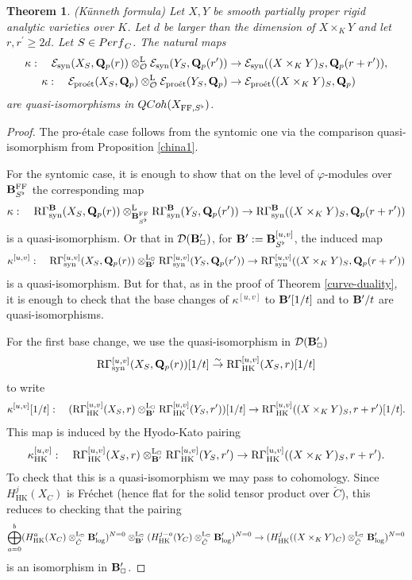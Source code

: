\documentclass[10pt,reqno]{amsart}
\newtheorem{theorem}[equation]{Theorem}
\theoremstyle{definition}
\theoremstyle{remark}
\def\phi{\varphi}
\newcommand{\proeet}{\operatorname{pro\acute{e}t} }
\newcommand{\synt}{ \operatorname{syn} }
\newcommand{\hk}{\operatorname{HK} }
\newcommand{\LL}{\operatorname{L} }
\newcommand{\FF}{\operatorname{FF} }
\newcommand{\so}{{\mathcal O}}
\newcommand{\se}{{\mathcal{E}}}
\newcommand{\sd}{{\mathcal{D}}}
\numberwithin{equation}{section}
\def\R{{\mathrm R}}
\def\Q{{\bf Q}} \def\Z{{\bf Z}}
\def\KAPPA{$\kappa$, $\kappa_{\rm HT}$, $\kappa_{\rm dR}$, $\kappa^{[u,v]}$}
\numberwithin{equation}{section}
\begin{document}
 \begin{theorem}{\rm(K\"unneth formula)} Let $X,Y$ be smooth partially proper rigid analytic varieties over $K$. Let $d$ be larger than the dimension of $X\times_KY$ and let $r,r^{\prime}\geq 2d$.  Let $S\in {\rm Perf}_C$.
 The natural \index{KAPPA@\KAPPA}maps 
 \begin{align*}
\kappa:\quad   \se_{\synt}(X_S,\Q_p(r))\otimes^{\LL}_{\so} \se_{\synt}(Y_S,\Q_p(r^{\prime}))  & \to \se_{\synt}((X\times_K Y)_S,\Q_p(r+r^{\prime})),\\
\kappa:\quad   \se_{\proeet}(X_S,\Q_p)\otimes^{\LL}_{\so} \se_{\proeet}(Y_S,\Q_p)  & \to \se_{\proeet}((X\times_K Y)_S,\Q_p)
 \end{align*}
 are quasi-isomorphisms in ${\rm QCoh}(X_{\FF,S^{\flat}})$. 
  \end{theorem}
 \begin{proof} The pro-\'etale case follows from the syntomic one via the comparison quasi-isomorphism from Proposition \ref{china1}.
 
  For the syntomic case,  it is enough to show that on the level of $\phi$-modules over  $\B^{\FF}_{S^{\flat}}$ the corresponding map
 $$
 \kappa:  \quad\R\Gamma_{\synt}^{\B}(X_S,\Q_p(r))\otimes^{\LL}_{\B^{\FF}_{S^{\flat}}} \R\Gamma_{\synt}^{\B}(Y_S,\Q_p(r^{\prime})) \to \R\Gamma_{\synt}^{\B}((X\times_K Y)_S,\Q_p(r+r^{\prime}))
 $$
 is a quasi-isomorphism.  Or that in $\sd(\B^{\prime}_{\Box})$, for  ${\bf B}^{\prime}:={\bf B}_{S^{\flat}}^{[u,v]}$, the induced \index{KAPPA@\KAPPA}map
 $$
  \kappa^{[u,v]}: \quad  \R\Gamma_{\synt}^{{[u,v]}}(X_S,\Q_p(r))\otimes^{\LL_{\Box}}_{\B^{\prime}} \R\Gamma_{\synt}^{{[u,v]}}(Y_S,\Q_p(r^{\prime})) \to \R\Gamma_{\synt}^{{[u,v]}}((X\times_K Y)_S,\Q_p(r+r^{\prime}))
  $$
 is a quasi-isomorphism.   But for that, as in the proof of Theorem \ref{curve-duality},  it is enough to check that the base changes of $  \kappa^{[u,v]}$ to ${\bf B}^{\prime}[1/t]$ and to ${\bf B}^{\prime}/t$ are quasi-isomorphisms. 
 
  For the first base change, we use the quasi-isomorphism in $\sd(\B^{\prime}_{\Box})$
$$
 \R\Gamma^{{[u,v]}}_{\synt}(X_S,\Q_p(r))[1/t]  \stackrel{\sim}{\to} \R\Gamma^{{[u,v]}}_{\hk}(X_S,r)[1/t]
 $$
 to write
 $$
  \kappa^{[u,v]}[1/t]: \quad (\R\Gamma^{{[u,v]}}_{\hk}(X_S,r)\otimes^{\LL_{\Box}}_{\B^{\prime}}\R\Gamma^{{[u,v]}}_{\hk}(Y_S,r^{\prime}))[1/t]\to \R\Gamma^{{[u,v]}}_{\hk}((X\times_KY)_S,r+r^{\prime})[1/t].
  $$
 This map is induced by the Hyodo-Kato pairing
$$
  \kappa^{[u,v]}_{\hk}: \quad \R\Gamma^{{[u,v]}}_{\hk}(X_S,r)\otimes^{\LL_{\Box}}_{\B^{\prime}}\R\Gamma^{{[u,v]}}_{\hk}(Y_S,r^{\prime})\to \R\Gamma^{{[u,v]}}_{\hk}((X\times_KY)_S,r+r^{\prime}).
  $$
  To check that this is a quasi-isomorphism we may pass to cohomology. Since $H^j_{\hk}(X_C)$ is Fr\'echet (hence flat for the solid tensor product over $\breve{C}$), this reduces
  to checking that the pairing
  $$
  \bigoplus_{a=0}^b (H^a_{\hk}(X_C)\otimes^{\LL_{\Box}}_{\breve{C}}\B^{\prime}_{\log})^{N=0}\otimes^{\LL_{\Box}}_{\B^{\prime}} (H^{j-a}_{\hk}(Y_C)\otimes^{\LL_{\Box}}_{\breve{C}}\B^{\prime}_{\log})^{N=0}
  \to  (H^j_{\hk}((X\times_KY)_C)\otimes^{\LL_{\Box}}_{\breve{C}}\B^{\prime}_{\log})^{N=0}
  $$
  is an isomorphism in ${\bf B}^{\prime}_{\Box}$. 
  

\end{proof}
\end{document}
